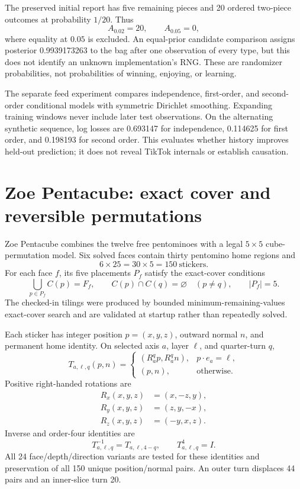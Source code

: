 The preserved initial report has five remaining pieces and 20 ordered two-piece outcomes at probability $1/20$. Thus
\begin{equation}
A_{0.02}=20,\qquad A_{0.05}=0,
\end{equation}
where equality at $0.05$ is excluded. An equal-prior candidate comparison assigns posterior 0.9939173263 to the bag after one observation of every type, but this does not identify an unknown implementation's RNG. These are randomizer probabilities, not probabilities of winning, enjoying, or learning.

The separate feed experiment compares independence, first-order, and second-order conditional models with symmetric Dirichlet smoothing. Expanding training windows never include later test observations. On the alternating synthetic sequence, log losses are 0.693147 for independence, 0.114625 for first order, and 0.198193 for second order. This evaluates whether history improves held-out prediction; it does not reveal TikTok internals or establish causation.

\section{Zoe Pentacube: exact cover and reversible permutations}
Zoe Pentacube combines the twelve free pentominoes with a legal $5\times5$ cube-permutation model. Six solved faces contain thirty pentomino home regions and
\begin{equation}
6\times25=30\times5=150\ \text{stickers}.
\end{equation}
For each face $f$, its five placements $P_f$ satisfy the exact-cover conditions
\begin{equation}
\bigcup_{p\in P_f}C(p)=F_f,\qquad
C(p)\cap C(q)=\varnothing\quad(p\neq q),\qquad |P_f|=5.
\end{equation}
The checked-in tilings were produced by bounded minimum-remaining-values exact-cover search and are validated at startup rather than repeatedly solved.

Each sticker has integer position $p=(x,y,z)$, outward normal $n$, and permanent home identity. On selected axis $a$, layer $\ell$, and quarter-turn $q$,
\begin{equation}
T_{a,\ell,q}(p,n)=
\begin{cases}
(R_a^qp,R_a^qn),&p\cdot e_a=\ell,\\
(p,n),&\text{otherwise}.
\end{cases}
\end{equation}
Positive right-handed rotations are
\begin{align}
R_x(x,y,z)&=(x,-z,y),\\
R_y(x,y,z)&=(z,y,-x),\\
R_z(x,y,z)&=(-y,x,z).
\end{align}
Inverse and order-four identities are
\begin{equation}
T_{a,\ell,q}^{-1}=T_{a,\ell,4-q},\qquad T_{a,\ell,q}^{4}=I.
\end{equation}
All 24 face/depth/direction variants are tested for these identities and preservation of all 150 unique position/normal pairs. An outer turn displaces 44 pairs and an inner-slice turn 20.

